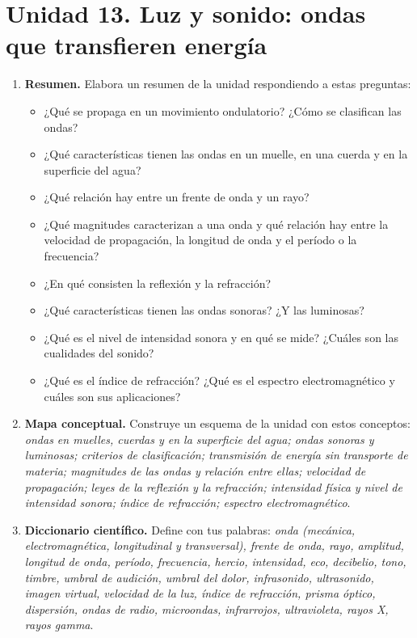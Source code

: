 \section{Unidad 13. Luz y sonido: ondas que transfieren energía}

\begin{enumerate}[label=\numberballred]
    \item \textbf{Resumen.} Elabora un resumen de la unidad respondiendo a estas preguntas:
    \begin{itemize}
        \item ¿Qué se propaga en un movimiento ondulatorio? ¿Cómo se clasifican las ondas?
        \item ¿Qué características tienen las ondas en un muelle, en una cuerda y en la superficie del agua?
        \item ¿Qué relación hay entre un frente de onda y un rayo?
        \item ¿Qué magnitudes caracterizan a una onda y qué relación hay entre la velocidad de propagación, la longitud de onda y el período o la frecuencia?
        \item ¿En qué consisten la reflexión y la refracción?
        \item ¿Qué características tienen las ondas sonoras? ¿Y las luminosas?
        \item ¿Qué es el nivel de intensidad sonora y en qué se mide? ¿Cuáles son las cualidades del sonido?
        \item ¿Qué es el índice de refracción? ¿Qué es el espectro electromagnético y cuáles son sus aplicaciones?
    \end{itemize}
    \item \textbf{Mapa conceptual.} Construye un esquema de la unidad con estos conceptos: \emph{ondas en muelles, cuerdas y en la superficie del agua; ondas sonoras y luminosas; criterios de clasificación; transmisión de energía sin transporte de materia; magnitudes de las ondas y relación entre ellas; velocidad de propagación; leyes de la reflexión y la refracción; intensidad física y nivel de intensidad sonora; índice de refracción; espectro electromagnético}.
    \item \textbf{Diccionario científico.} Define con tus palabras: \emph{onda (mecánica, electromagnética, longitudinal y transversal), frente de onda, rayo, amplitud, longitud de onda, período, frecuencia, hercio, intensidad, eco, decibelio, tono, timbre, umbral de audición, umbral del dolor, infrasonido, ultrasonido, imagen virtual, velocidad de la luz, índice de refracción, prisma óptico, dispersión, ondas de radio, microondas, infrarrojos, ultravioleta, rayos X, rayos gamma}.
\end{enumerate}
